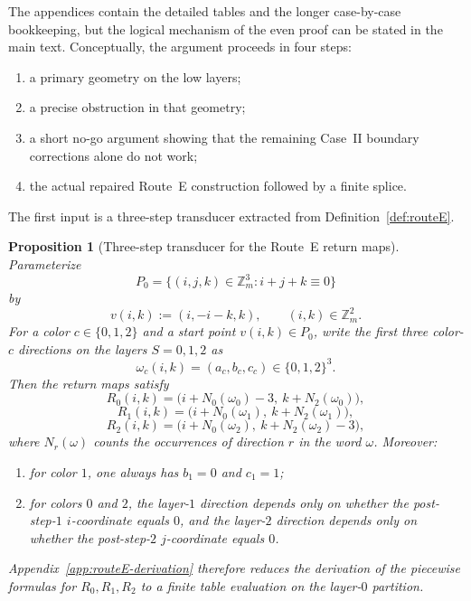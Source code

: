 \documentclass[11pt]{article}
\newtheorem{proposition}{Proposition}
\begin{document}
The appendices contain the detailed tables and the longer case-by-case bookkeeping, but the logical mechanism of the even proof can be stated in the main text.
Conceptually, the argument proceeds in four steps:
\begin{enumerate}[label=\textup{(\roman*)},leftmargin=2.5em]
\item a primary geometry on the low layers;
\item a precise obstruction in that geometry;
\item a short no-go argument showing that the remaining Case~II boundary corrections alone do not work;
\item the actual repaired Route~E construction followed by a finite splice.
\end{enumerate}
The first input is a three-step transducer extracted from Definition~\ref{def:routeE}.

\begin{proposition}[Three-step transducer for the Route~E return maps]\label{prop:routeE-transducer}
Parameterize
\[
P_0=\{(i,j,k)\in \mathbb Z_m^3:i+j+k\equiv 0\}
\]
by
\[
v(i,k):=(i,-i-k,k),\qquad (i,k)\in \mathbb Z_m^2.
\]
For a color $c\in\{0,1,2\}$ and a start point $v(i,k)\in P_0$, write the first three color-$c$ directions on the layers $S=0,1,2$ as
\[
\omega_c(i,k)=(a_c,b_c,c_c)\in\{0,1,2\}^3.
\]
Then the return maps satisfy
\[
R_0(i,k)=\bigl(i+N_0(\omega_0)-3,\ k+N_2(\omega_0)\bigr),
\]
\[
R_1(i,k)=\bigl(i+N_0(\omega_1),\ k+N_2(\omega_1)\bigr),
\]
\[
R_2(i,k)=\bigl(i+N_0(\omega_2),\ k+N_2(\omega_2)-3\bigr),
\]
where $N_r(\omega)$ counts the occurrences of direction $r$ in the word $\omega$.
Moreover:
\begin{enumerate}[label=\textup{(\roman*)},leftmargin=2.5em]
\item for color $1$, one always has $b_1=0$ and $c_1=1$;
\item for colors $0$ and $2$, the layer-$1$ direction depends only on whether the post-step-$1$ $i$-coordinate equals $0$, and the layer-$2$ direction depends only on whether the post-step-$2$ $j$-coordinate equals $0$.
\end{enumerate}
Appendix~\ref{app:routeE-derivation} therefore reduces the derivation of the piecewise formulas for $R_0,R_1,R_2$ to a finite table evaluation on the layer-$0$ partition.
\end{proposition}
\end{document}
